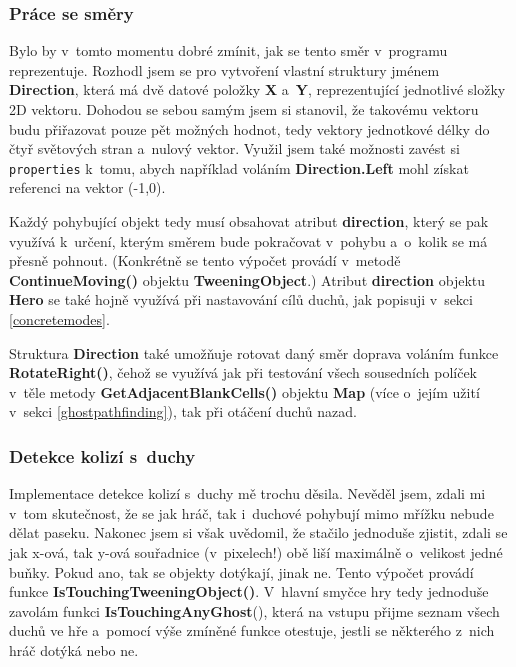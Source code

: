 \documentclass[a4]{article}
\begin{document}
\subsubsection{Práce se směry} \label{directions}
Bylo by v~tomto momentu dobré zmínit, jak se tento směr v~programu reprezentuje. Rozhodl jsem se pro vytvoření vlastní struktury jménem \textbf{Direction}, která má dvě datové položky \textbf{X} a~\textbf{Y}, reprezentující jednotlivé složky 2D vektoru. Dohodou se sebou samým jsem si stanovil, že takovému vektoru budu přiřazovat pouze pět možných hodnot, tedy vektory jednotkové délky do čtyř světových stran a~nulový vektor. Využil jsem také možnosti zavést si \verb|properties| k~tomu, abych například voláním \textbf{Direction.Left} mohl získat referenci na vektor (-1,0).

Každý pohybující objekt tedy musí obsahovat atribut \textbf{direction}, který se pak využívá k~určení, kterým směrem bude pokračovat v~pohybu a~o~kolik se má přesně pohnout. (Konkrétně se tento výpočet provádí v~metodě \textbf{ContinueMoving()} objektu \textbf{TweeningObject}.) Atribut \textbf{direction} objektu \textbf{Hero} se také hojně využívá při nastavování cílů duchů, jak popisuji v~sekci \ref{concretemodes}.

Struktura \textbf{Direction} také umožňuje rotovat daný směr doprava voláním funkce \textbf{RotateRight()}, čehož se využívá jak při testování všech sousedních políček v~těle metody \textbf{GetAdjacentBlankCells()} objektu \textbf{Map} (více o~jejím užití v~sekci \ref{ghostpathfinding}), tak při otáčení duchů nazad.

\subsubsection{Detekce kolizí s~duchy} \label{collisiondetection}
Implementace detekce kolizí s~duchy mě trochu děsila. Nevěděl jsem, zdali mi v~tom skutečnost, že se jak hráč, tak i~duchové pohybují mimo mřížku nebude dělat paseku. Nakonec jsem si však uvědomil, že stačilo jednoduše zjistit, zdali se jak x-ová, tak y-ová souřadnice (v~pixelech!) obě liší maximálně o~velikost jedné buňky. Pokud ano, tak se objekty dotýkají, jinak ne. Tento výpočet provádí funkce \textbf{IsTouchingTweeningObject()}. V~hlavní smyčce hry tedy jednoduše zavolám funkci \textbf{IsTouchingAnyGhost}(), která na vstupu přijme seznam všech duchů ve hře a~pomocí výše zmíněné funkce otestuje, jestli se některého z~nich hráč dotýká nebo ne.
\end{document}
